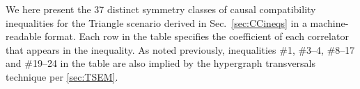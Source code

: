 \documentclass[aps,english,superscriptaddress,onecolumn,twoside,longbibliography,pra,floatfix,fleqn,nofootinbib]{revtex4-1}%
\theoremstyle{definition}
\begin{document}
We here present the 37 distinct symmetry classes of causal compatibility inequalities for the Triangle scenario derived in Sec.~\ref{sec:CCineqs} in a machine-readable format.  Each row in the table specifies the coefficient of each correlator that appears in the inequality.  As noted previously, inequalities \#1, \#3--4, \#8--17 and \#19--24 in the table are also implied by the hypergraph transversals technique per \cref{sec:TSEM}.

\end{document}
